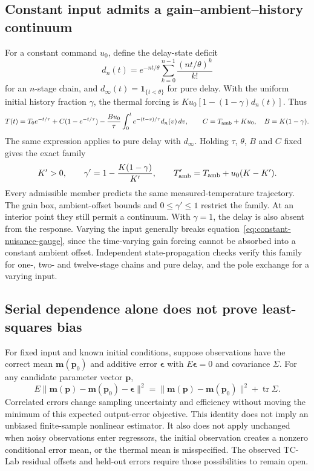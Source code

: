\subsection{Constant input admits a gain--ambient--history continuum}
For a constant command $u_0$, define the delay-state deficit
\[
d_n(t)=e^{-nt/\theta}\sum_{k=0}^{n-1}\frac{(nt/\theta)^k}{k!}
\]
for an $n$-stage chain, and $d_\infty(t)=\mathbf 1_{\{t<\theta\}}$
for pure delay. With the uniform initial history fraction $\gamma$, the
thermal forcing is $K u_0[1-(1-\gamma)d_n(t)]$. Thus
\[
 T(t)=T_0 e^{-t/\tau}+C(1-e^{-t/\tau})
 -\frac{B u_0}{\tau}\int_0^t e^{-(t-v)/\tau}d_n(v)\,dv,
 \qquad C=T_{\mathrm{amb}}+K u_0,\quad B=K(1-\gamma).
\]
The same expression applies to pure delay with $d_\infty$. Holding $\tau$,
$\theta$, $B$ and $C$ fixed gives the exact family
\begin{equation}
 K'>0,\qquad
 \gamma'=1-\frac{K(1-\gamma)}{K'},\qquad
 T_{\mathrm{amb}}'=T_{\mathrm{amb}}+u_0(K-K').
 \label{eq:constant-nuisance-gauge}
\end{equation}
Every admissible member predicts the same measured-temperature trajectory.
The gain box, ambient-offset bounds and $0\leq\gamma'\leq1$ restrict the
family. At an interior point they still permit a continuum. With
$\gamma=1$, the delay is also absent from the response. Varying the input
generally breaks equation~\eqref{eq:constant-nuisance-gauge}, since the
time-varying gain forcing cannot be absorbed into a constant ambient offset.
Independent state-propagation checks verify this family for one-, two- and
twelve-stage chains and pure delay, and the pole exchange for a varying input.

\subsection{Serial dependence alone does not prove least-squares bias}
For fixed input and known initial conditions, suppose observations have the
correct mean $\bm m(\bm p_0)$ and additive error $\bm\epsilon$ with
$E\bm\epsilon=0$ and covariance $\Sigma$. For any candidate parameter vector
$\bm p$,
\[
 E\|\bm m(\bm p)-\bm m(\bm p_0)-\bm\epsilon\|^2
 =\|\bm m(\bm p)-\bm m(\bm p_0)\|^2+\operatorname{tr}\Sigma.
\]
Correlated errors change sampling uncertainty and efficiency without moving the
minimum of this expected output-error objective. This identity does not imply
an unbiased finite-sample nonlinear estimator. It also does not apply unchanged
when noisy observations enter regressors, the initial observation creates a
nonzero conditional error mean, or the thermal mean is misspecified. The
observed TC-Lab residual offsets and held-out errors require those possibilities
to remain open.

